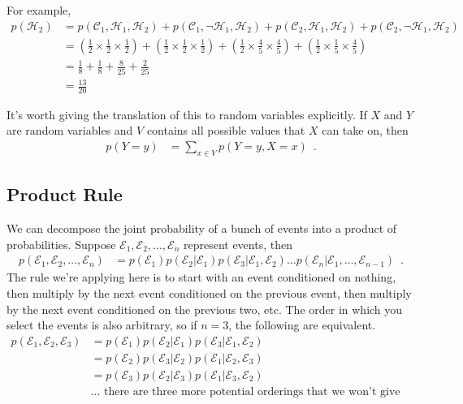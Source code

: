 \documentclass{tufte-handout}
\begin{document}
For example,
\begin{align}
p(\mathcal{H}_2) &= p(\mathcal{C}_1, \mathcal{H}_1, \mathcal{H}_2) + p(\mathcal{C}_1, \neg \mathcal{H}_1, \mathcal{H}_2) + p(\mathcal{C}_2, \mathcal{H}_1, \mathcal{H}_2) + p(\mathcal{C}_2, \neg \mathcal{H}_1, \mathcal{H}_2) \nonumber \\
&= \left ( \frac{1}{2} \times \frac{1}{2} \times \frac{1}{2} \right) + \left ( \frac{1}{2} \times \frac{1}{2} \times \frac{1}{2} \right) + \left ( \frac{1}{2} \times \frac{4}{5} \times \frac{4}{5} \right) + \left ( \frac{1}{2} \times \frac{1}{5} \times \frac{4}{5} \right) \nonumber \\
&= \frac{1}{8} + \frac{1}{8} + \frac{8}{25} + \frac{2}{25} \nonumber \\
&= \frac{13}{20} \nonumber
\end{align}


It's worth giving the translation of this to random variables explicitly.  If $X$ and $Y$ are random variables and $V$ contains all possible values that $X$ can take on, then
\begin{align}
p(Y=y) &= \sum_{x \in V} p(Y=y, X=x) \enspace .
\end{align}


\subsection{Product Rule}

We can decompose the joint probability of a bunch of events into a product of probabilities.  Suppose $\mathcal{E}_1, \mathcal{E}_2, \ldots, \mathcal{E}_n$ represent events, then
\begin{align}
p(\mathcal{E}_1, \mathcal{E}_2, \ldots, \mathcal{E}_n) &= p(\mathcal{E}_1) p(\mathcal{E}_2 | \mathcal{E}_1) p(\mathcal{E}_3 | \mathcal{E}_1, \mathcal{E}_2) \ldots p(\mathcal{E}_n | \mathcal{E}_1, \ldots, \mathcal{E}_{n-1}) \enspace .
\end{align}
The rule we're applying here is to start with an event conditioned on nothing, then multiply by the next event conditioned on the previous event, then multiply by the next event conditioned on the previous two, etc.  The order in which you select the events is also arbitrary, so if $n=3$, the following are equivalent.
\begin{align}
p(\mathcal{E}_1, \mathcal{E}_2, \mathcal{E}_3) &= p(\mathcal{E}_1) p(\mathcal{E}_2|\mathcal{E}_1)p(\mathcal{E}_3|\mathcal{E}_1, \mathcal{E}_2) \nonumber \\
&= p(\mathcal{E}_2) p(\mathcal{E}_3|\mathcal{E}_2)p(\mathcal{E}_1|\mathcal{E}_2, \mathcal{E}_3) \nonumber \\
&= p(\mathcal{E}_3) p(\mathcal{E}_2|\mathcal{E}_3)p(\mathcal{E}_1|\mathcal{E}_3, \mathcal{E}_2) \nonumber \\
&\mbox{... there are three more potential orderings that we won't give explicitly} \nonumber
\end{align}
\end{document}
